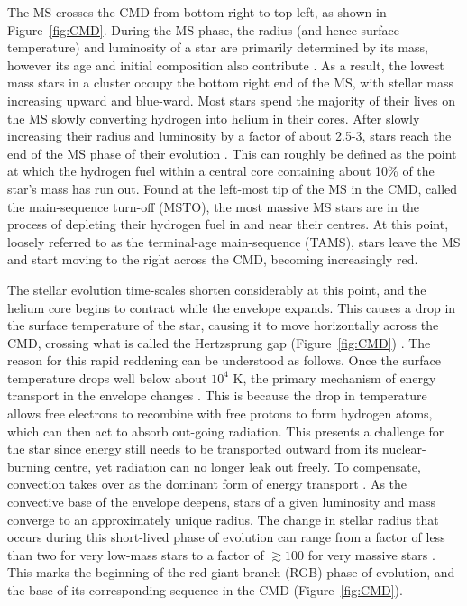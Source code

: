 The MS crosses the CMD from bottom right to top left, as shown in
Figure~\ref{fig:CMD}.  During the MS phase, the radius (and hence 
surface temperature) and luminosity
of a star are primarily determined by its mass, however its age and
initial composition also contribute \citep[e.g.][]{iben91, tout96}.  As a
result, the lowest mass stars in a cluster occupy 
the bottom right end of the MS, with stellar mass increasing 
upward and blue-ward.  Most stars spend the majority of
their lives on the MS slowly converting hydrogen into helium in their
cores.  After slowly increasing their
radius and luminosity by a factor of about 2.5-3, stars reach the end
of the MS phase of their evolution \citep{eggleton06}.  This can
roughly be defined as the point at which the hydrogen fuel within a
central core containing about 10\% of the star's mass has run out.  
Found at the left-most tip of the MS in the CMD, called the
main-sequence turn-off (MSTO), the most massive MS 
stars are in the process of depleting their hydrogen fuel in and near
their centres.  At this point, loosely
referred to as the terminal-age main-sequence (TAMS), stars leave the
MS and start moving to the right across
the CMD, becoming increasingly red.  

The stellar evolution time-scales shorten considerably at this point, and
the helium core begins to contract while the envelope expands.  This
causes a drop in the surface temperature of the star, causing it to
move horizontally across the CMD, crossing what
is called the Hertzsprung gap (Figure~\ref{fig:CMD})
\citep[e.g.][]{popper80}.  The reason for 
this rapid reddening can be understood as follows.  Once the
surface temperature drops well below about $10^4$ K, the primary
mechanism of energy transport in the envelope changes
\citep{eggleton06}.  This is
because the drop in temperature
allows free electrons to recombine with free protons to form
hydrogen atoms, which 
can then act to absorb out-going radiation.  This presents a challenge
for the star since energy still needs to be
transported outward from its nuclear-burning centre, yet radiation can
no longer leak out freely.  To compensate,
convection takes over as the dominant form of energy transport
\citep[e.g.][]{bohm-vitense58}.  As
the convective 
base of the envelope deepens, stars of a given luminosity and mass
converge to an approximately unique radius.  The change in stellar
radius that occurs during this short-lived phase of evolution can
range from a factor of less than two for very low-mass stars to a
factor of $\gtrsim 100$ for very massive stars \citep{iben91}.  This
marks the beginning 
of the red giant branch (RGB) phase of evolution, and the base of its
corresponding sequence in the CMD (Figure~\ref{fig:CMD}).  

